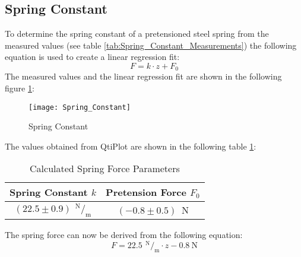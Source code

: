 \subsection{Spring Constant}
\label{subsec:Spring_Constant}
To determine the spring constant of a pretensioned steel spring from the measured values (see table \ref{tab:Spring_Constant_Measurements}) the following equation is used to create a linear regression fit:
\begin{equation}
F=k\cdot z+F_0
\end{equation}
The measured values and the linear regression fit are shown in the following figure \ref{fig:Spring_Constant}:
\begin{figure}[H]
	\centering
	\texttt{[image: Spring\_Constant]}
	\caption{Spring Constant}
	\label{fig:Spring_Constant}
\end{figure}
The values obtained from QtiPlot are shown in the following table \ref{tab:Calculated_Spring_Force_Parameters}:
\begin{table}[H]
	\centering
	\renewcommand{\arraystretch}{1.3}
	\begin{tabular}{c c}
		\hline
		\textbf{Spring Constant $k$} & \textbf{Pretension Force $F_0$} \\
		\hline
		$(22.5\pm0.9)\ \,^\text{N}\!/_\text{m}$ & $(-0.8\pm0.5)$\ N \\ \hline
	\end{tabular}
	\caption{Calculated Spring Force Parameters}
	\label{tab:Calculated_Spring_Force_Parameters}
\end{table}
The spring force can now be derived from the following equation:
\begin{equation}
F=22.5\ \,^\text{N}\!/_\text{m}\cdot z-0.8\ \text{N}
\end{equation}
\newpage
